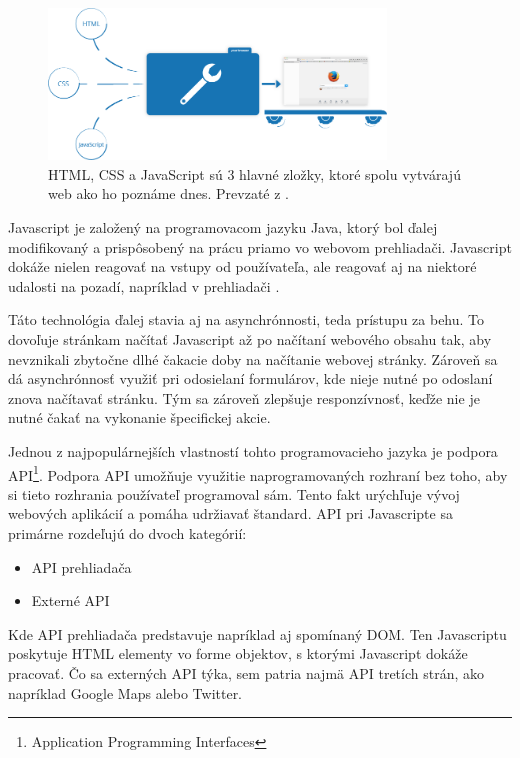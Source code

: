 \newpage
\begin{figure}[hbt]
	\centering
	\includegraphics[width=0.8\textwidth]{obrazky-figures/jsexecution.png}
	\caption{HTML, CSS a JavaScript sú 3 hlavné zložky, ktoré spolu vytvárajú web ako ho poznáme dnes. Prevzaté z \cite{Javascript}.}
	\label{Jsexecution_img}
\end{figure}

\bigskip

Javascript je založený na programovacom jazyku Java, ktorý bol ďalej modifikovaný a prispôsobený na prácu priamo vo webovom prehliadači. Javascript dokáže nielen reagovať na vstupy od používateľa, ale reagovať aj na niektoré udalosti na pozadí, napríklad v prehliadači \cite{Javascript}. 

Táto technológia ďalej stavia aj na asynchrónnosti, teda prístupu za behu. To dovoľuje stránkam načítať Javascript až po načítaní webového obsahu tak, aby nevznikali zbytočne dlhé čakacie doby na načítanie webovej stránky. Zároveň sa dá asynchrónnosť využiť pri odosielaní formulárov, kde nieje nutné po odoslaní znova načítavať stránku. Tým sa zároveň zlepšuje responzívnosť, keďže nie je nutné čakať na vykonanie špecifickej akcie. 

Jednou z najpopulárnejších vlastností tohto programovacieho jazyka je podpora API\footnote{Application Programming Interfaces}. Podpora API umožňuje využitie naprogramovaných rozhraní bez toho, aby si tieto rozhrania používateľ programoval sám. Tento fakt urýchľuje vývoj webových aplikácií a pomáha udržiavať štandard. API pri Javascripte sa primárne rozdeľujú do dvoch kategórií:

\begin{itemize}
    \item {API prehliadača}
    \item {Externé API}
\end{itemize}

Kde API prehliadača predstavuje napríklad aj spomínaný DOM. Ten Javascriptu poskytuje HTML elementy vo forme objektov, s ktorými Javascript dokáže pracovať. Čo sa externých API týka, sem patria najmä API tretích strán, ako napríklad Google Maps alebo Twitter.

